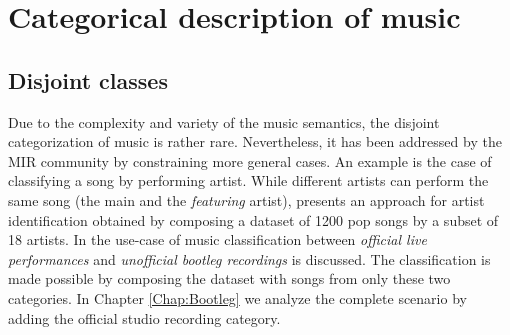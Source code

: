 







\section{Categorical description of music}\label{sec:HLFs:categorical}
\subsection{Disjoint classes}\label{sec:HLFs:class}
Due to the complexity and variety of the music semantics, the disjoint categorization of music is rather rare. Nevertheless, it has been addressed by the MIR community by constraining more general cases. An example is the case of classifying a song by performing artist. While different artists can perform the same song (the main and the \textit{featuring} artist), \cite{mandel2005song} presents an approach for artist identification obtained by composing a dataset of 1200 pop songs by a subset of 18 artists. In \cite{Bestagini2013b} the use-case of music classification between \textit{official live performances} and \textit{unofficial bootleg recordings} is discussed. The classification is made possible by composing the dataset with songs from only these two categories. In Chapter \ref{Chap:Bootleg} we analyze the complete scenario by adding the official studio recording category.


